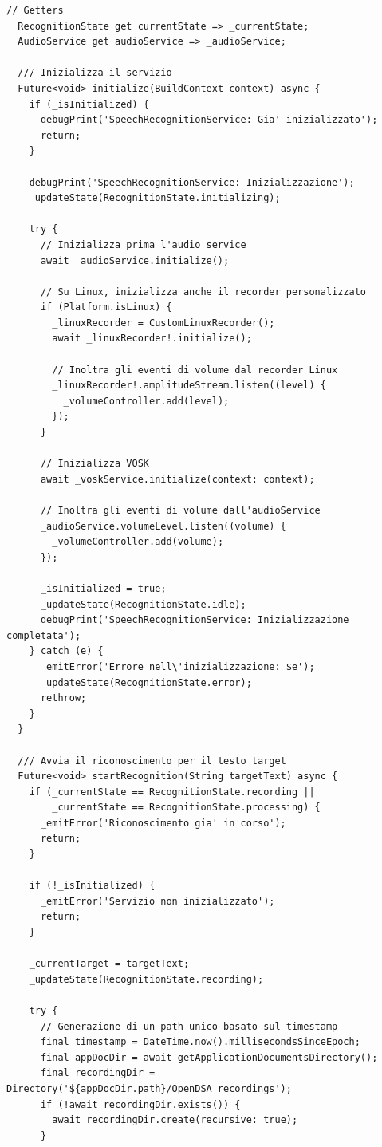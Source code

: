 \documentclass[14pt]{extbook}
\begin{document}
\begin{lstlisting}[caption=speech\_recognition\_service.dart, label=lst:SpeechRecognitionService]
  // Getters
  RecognitionState get currentState => _currentState;
  AudioService get audioService => _audioService;

  /// Inizializza il servizio
  Future<void> initialize(BuildContext context) async {
    if (_isInitialized) {
      debugPrint('SpeechRecognitionService: Gia' inizializzato');
      return;
    }

    debugPrint('SpeechRecognitionService: Inizializzazione');
    _updateState(RecognitionState.initializing);

    try {
      // Inizializza prima l'audio service
      await _audioService.initialize();

      // Su Linux, inizializza anche il recorder personalizzato
      if (Platform.isLinux) {
        _linuxRecorder = CustomLinuxRecorder();
        await _linuxRecorder!.initialize();

        // Inoltra gli eventi di volume dal recorder Linux
        _linuxRecorder!.amplitudeStream.listen((level) {
          _volumeController.add(level);
        });
      }

      // Inizializza VOSK
      await _voskService.initialize(context: context);

      // Inoltra gli eventi di volume dall'audioService
      _audioService.volumeLevel.listen((volume) {
        _volumeController.add(volume);
      });

      _isInitialized = true;
      _updateState(RecognitionState.idle);
      debugPrint('SpeechRecognitionService: Inizializzazione completata');
    } catch (e) {
      _emitError('Errore nell\'inizializzazione: $e');
      _updateState(RecognitionState.error);
      rethrow;
    }
  }

  /// Avvia il riconoscimento per il testo target
  Future<void> startRecognition(String targetText) async {
    if (_currentState == RecognitionState.recording ||
        _currentState == RecognitionState.processing) {
      _emitError('Riconoscimento gia' in corso');
      return;
    }

    if (!_isInitialized) {
      _emitError('Servizio non inizializzato');
      return;
    }

    _currentTarget = targetText;
    _updateState(RecognitionState.recording);

    try {
      // Generazione di un path unico basato sul timestamp
      final timestamp = DateTime.now().millisecondsSinceEpoch;
      final appDocDir = await getApplicationDocumentsDirectory();
      final recordingDir = Directory('${appDocDir.path}/OpenDSA_recordings');
      if (!await recordingDir.exists()) {
        await recordingDir.create(recursive: true);
      }


\end{lstlisting}
\end{document}
